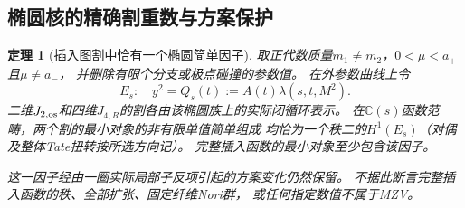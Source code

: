 \documentclass[11pt,a4paper]{ctexart}
\theoremstyle{cnplain}\newtheorem{theorem}{定理}[section]
\theoremstyle{definition}\newtheorem{definition}[theorem]{定义}
\theoremstyle{remark}\newtheorem{remark}[theorem]{注}
\begin{document}
\subsection{椭圆核的精确割重数与方案保护}
\begin{theorem}[插入图割中恰有一个椭圆简单因子]\label{thm:insertelliptic}
取正代数质量$m_1\ne m_2$，$0<\mu<a_+$且$\mu\ne a_-$，
并删除有限个分支或极点碰撞的参数值。
在外参数曲线上令
\[
 E_s:\quad y^2=Q_s(t):=A(t)\lambda(s,t,M^2).
\]
二维$J_{2,\rm os}$和四维$J_{4,R}$的割各由该椭圆族上的实际闭循环表示。
在$\mathbb C(s)$函数范畴，两个割的最小对象的非有限单值简单组成
均恰为一个秩二的$H^1(E_s)$（对偶及整体Tate扭转按所选方向记）。
完整插入函数的最小对象至少包含该因子。

这一因子经由一圈实际局部子反项引起的方案变化仍然保留。
不据此断言完整插入函数的秩、全部扩张、固定纤维Nori群，
或任何指定数值不属于MZV。
\end{theorem}
\end{document}
